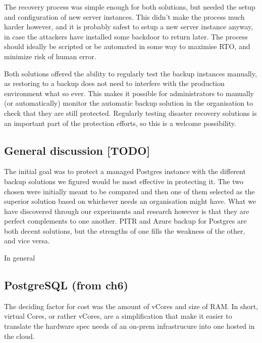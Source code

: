 
The recovery process was simple enough for both solutions, but needed the setup and configuration of new server instances. This didn't make the process much harder however, and it is probably safest to setup a new server instance anyway, in case the attackers have installed some backdoor to return later. The process should ideally be scripted or be automated in some way to maximise RTO, and minimize risk of human error. 

Both solutions offered the ability to regularly test the backup instances manually, as restoring to a backup does not need to interfere with the production environment what so ever. This makes it possible for administrators to manually (or automatically) monitor the automatic backup solution in the organisation to check that they are still protected. Regularly testing disaster recovery solutions is an important part of the protection efforts, so this is a welcome possibility.  

\subsection{General discussion [TODO]}

The initial goal was to protect a managed Postgres instance with the different backup solutions we figured would be most effective in protecting it. The two chosen were initially meant to be compared and then one of them selected as the superior solution based on whichever needs an organisation might have. What we have discovered through our experiments and research however is that they are perfect complements to one another. PITR and Azure backup for Postgres are both decent solutions, but the strengths of one fills the weakness of the other, and vice versa.

In general 

\subsection{PostgreSQL (from ch6)}


The deciding factor for cost was the amount of vCores and size of RAM. In short, virtual Cores, or rather vCores, are a simplification that make it easier to translate the hardware spec needs of an on-prem infrastrucure into one hosted in the cloud.

